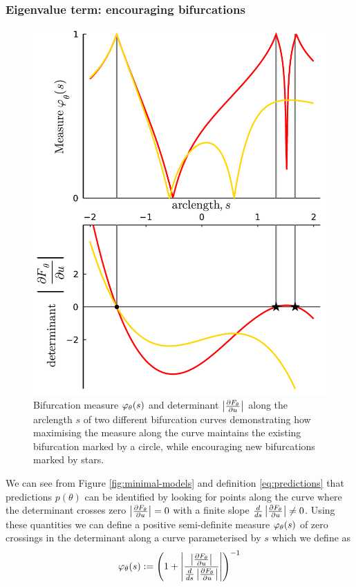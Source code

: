 \documentclass{article}
\begin{document}
\subsubsection{Eigenvalue term: encouraging bifurcations}
\begin{figure}
    \centering
    \includegraphics[width=\linewidth]{bifurcation-measure}
    \caption{Bifurcation measure $\varphi_{\theta}(s)$ and determinant $\left| \frac{\partial F_{\theta}}{\partial u} \right|$ along the arclength $s$ of two different bifurcation curves demonstrating how maximising the measure along the curve maintains the existing bifurcation marked by a circle, while encouraging new bifurcations marked by stars.}
    \label{fig:measure}
\end{figure}

We can see from Figure \ref{fig:minimal-models} and definition \eqref{eq:predictions} that predictions $p(\theta)$ can be identified by looking for points along the curve where the determinant crosses zero $\left| \frac{\partial F_{\theta}}{\partial u} \right|=0$ with a finite slope $\frac{d}{ds}\left| \frac{\partial F_{\theta}}{\partial u} \right|\neq 0$. Using these quantities we can define a positive semi-definite measure $\varphi_{\theta}(s)$ of zero crossings in the determinant along a curve parameterised by $s$ which we define as 
\begin{equation}
    \varphi_{\theta}(s):=
    \left(1+\left|\frac{\left| \frac{\partial F_{\theta}}{\partial u} \right|}{\frac{d}{ds}\left| \frac{\partial F_{\theta}}{\partial u} \right|}\right|\right)^{-1}
    \label{eq:measure}
\end{equation}
\end{document}
